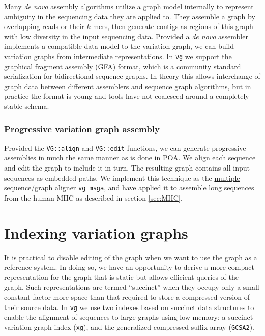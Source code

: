 \documentclass{article}
\begin{document}
Many \emph{de novo} assembly algorithms utilize a graph model internally to represent ambiguity in the sequencing data they are applied to.
They assemble a graph by overlapping reads or their $k$-mers, then generate contigs as regions of this graph with low diversity in the input sequencing data.
Provided a \emph{de novo} assembler implements a compatible data model to the variation graph, we can build variation graphs from intermediate representations.
In {\tt vg} we support the \href{https://github.com/pmelsted/GFA-spec}{graphical fragment assembly (GFA) format}, which is a community standard serialization for bidirectional sequence graphs.
In theory this allows interchange of graph data between different assemblers and sequence graph algorithms, but in practice the format is young and tools have not coalesced around a completely stable schema.

\subsubsection{Progressive variation graph assembly}

Provided the {\tt VG::align} and {\tt VG::edit} functions, we can generate progressive assemblies in much the same manner as is done in POA.
We align each sequence and edit the graph to include it in turn.
The resulting graph contains all input sequences as embedded paths.
We implement this technique as the \href{https://github.com/vgteam/vg/blob/fbcb6e62/src/main.cpp#L674-L1248}{multiple sequence/graph aligner {\tt vg msga}}, and have applied it to assemble long sequences from the human MHC as described in section \ref{sec:MHC}.

\section{Indexing variation graphs}

It is practical to disable editing of the graph when we want to use the graph as a reference system.
In doing so, we have an opportunity to derive a more compact representation for the graph that is static but allows efficient queries of the graph.
Such representations are termed ``succinct'' when they occupy only a small constant factor more space than that required to store a compressed version of their source data.
In {\tt vg} we use two indexes based on succinct data structures to enable the alignment of sequences to large graphs using low memory: a succinct variation graph index ({\tt xg}), and the generalized compressed suffix array ({\tt GCSA2}).
\end{document}
